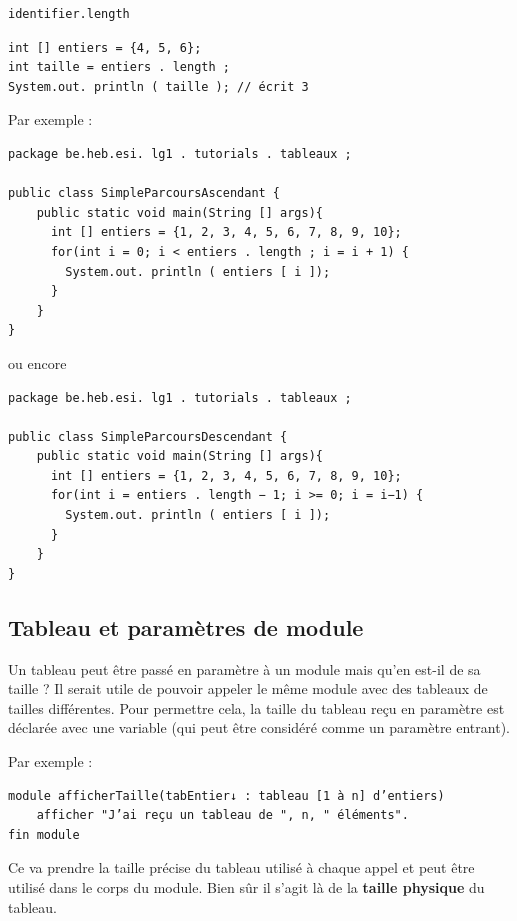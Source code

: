 \documentclass[11pt,a4paper]{article}
\begin{document}
            \par
        \begin{verbatim}
identifier.length
      \end{verbatim}\begin{verbatim}
int [] entiers = {4, 5, 6};
int taille = entiers . length ;
System.out. println ( taille ); // écrit 3
      \end{verbatim}Par exemple : 
            \par
        \begin{verbatim}
package be.heb.esi. lg1 . tutorials . tableaux ;

public class SimpleParcoursAscendant {
    public static void main(String [] args){
      int [] entiers = {1, 2, 3, 4, 5, 6, 7, 8, 9, 10};
      for(int i = 0; i < entiers . length ; i = i + 1) {
        System.out. println ( entiers [ i ]);
      }
    }
}
      \end{verbatim}ou encore
            \par
        \begin{verbatim}
package be.heb.esi. lg1 . tutorials . tableaux ;

public class SimpleParcoursDescendant {
    public static void main(String [] args){
      int [] entiers = {1, 2, 3, 4, 5, 6, 7, 8, 9, 10};
      for(int i = entiers . length − 1; i >= 0; i = i−1) {
        System.out. println ( entiers [ i ]);
      }
    }
}
      \end{verbatim}\subsection{Tableau et param\`etres de module}
		    Un tableau peut \^etre pass\'e en param\`etre \`a un module mais qu'en est-il de sa taille ? Il
        serait utile de pouvoir appeler le m\^eme module avec des tableaux de tailles diff\'erentes. Pour
        permettre cela, la taille du tableau re\c cu en param\`etre est d\'eclar\'ee avec une variable (qui
        peut \^etre consid\'er\'e comme un param\`etre entrant).
		  
            \par
        
		    Par exemple :
		  
            \par
        \begin{verbatim}
module afficherTaille(tabEntier↓ : tableau [1 à n] d’entiers)
    afficher "J’ai reçu un tableau de ", n, " éléments".
fin module
      \end{verbatim}
        Ce \verb@n@ va prendre la taille pr\'ecise du tableau utilis\'e \`a chaque appel
        et peut \^etre utilis\'e dans le corps du module. Bien s\^ur il s'agit l\`a de la 
        \textbf{taille physique} du tableau. 
      
\end{document}
